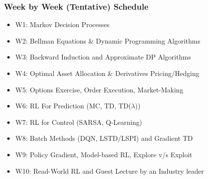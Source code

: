 \documentclass[handout]{beamer}
\begin{document}
\begin{frame}
\frametitle{Week by Week (Tentative) Schedule}
\pause
\begin{itemize}[<+->]
\item W1: Markov Decision Processes
\item W2: Bellman Equations \& Dynamic Programming Algorithms
\item W3: Backward Induction and Approximate DP Algorithms
\item W4: Optimal Asset Allocation \& Derivatives Pricing/Hedging
\item W5: Options Exercise,  Order Execution, Market-Making
\item W6: RL For Prediction (MC, TD, TD($\lambda$))
\item W7: RL for Control (SARSA, Q-Learning)
\item W8: Batch Methods (DQN, LSTD/LSPI) and Gradient TD
\item W9: Policy Gradient, Model-based RL, Explore v/s Exploit
\item W10: Read-World RL and Guest Lecture by an Industry leader
\end{itemize}
\end{frame}
\end{document}
